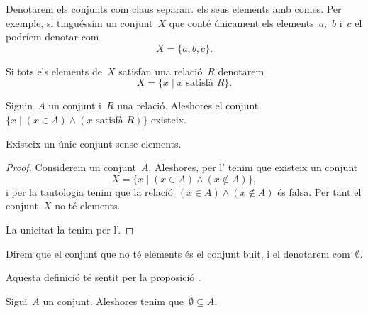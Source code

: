\documentclass[../../main.tex]{subfiles}
\begin{document}
    \begin{notation}
        Denotarem els conjunts com claus separant els seus elements amb comes.
        Per exemple, si tinguéssim un conjunt~\(X\) que conté únicament els elements~\(a\),~\(b\) i~\(c\) el podríem denotar com
        \[
            X=\{a,b,c\}.
        \]

        Si tots els elements de~\(X\) satisfan una relació~\(R\) denotarem
        \[
            X=\{x\mid x\text{ satisfà }R\}.
        \]
    \end{notation}
    \begin{axiom}
        \label{axiom:axioma-de-separacio}
        Siguin~\(A\) un conjunt i~\(R\) una relació.
        Aleshores el conjunt~\(\{x\mid(x\in A)\land(x\text{ satisfà }R)\}\) existeix.
    \end{axiom}
    \begin{proposition}
        \label{prop:conjunt-buit}
        Existeix un únic conjunt sense elements.
    \end{proposition}
    \begin{proof}
        Considerem un conjunt~\(A\).
        Aleshores, per l' tenim que existeix un conjunt
        \[
            X=\{x\mid(x\in A)\land(x\notin A)\},
        \]
        i per la tautologia  tenim que la relació~\((x\in A)\land(x\notin A)\) és falsa.
        Per tant el conjunt~\(X\) no té elements.

        La unicitat la tenim per l'.
    \end{proof}
    \begin{definition}
        Direm que el conjunt que no té elements és el conjunt buit, i el denotarem com~\(\emptyset\).

        Aquesta definició té sentit per la proposició .
    \end{definition}
    \begin{axiom}
        \label{axiom:axioma-de-regularitat}
        Sigui~\(A\) un conjunt.
        Aleshores tenim que~\(\emptyset\subseteq A\).
    \end{axiom}
\end{document}
